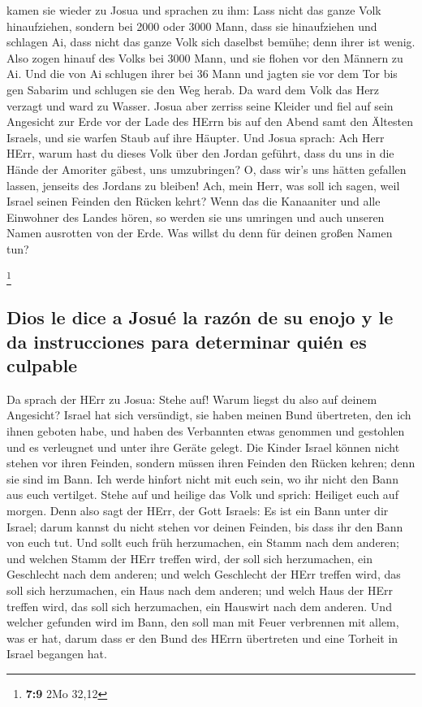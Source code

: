  kamen sie wieder zu Josua und sprachen zu ihm: Lass nicht
das ganze Volk hinaufziehen, sondern bei 2000 oder 3000 Mann, dass sie
hinaufziehen und schlagen Ai, dass nicht das ganze Volk sich daselbst
bemühe; denn ihrer ist wenig.  Also zogen hinauf des Volks
bei 3000 Mann, und sie flohen vor den Männern zu Ai.  Und
die von Ai schlugen ihrer bei 36 Mann und jagten sie vor dem Tor bis gen
Sabarim und schlugen sie den Weg herab. Da ward dem Volk das Herz
verzagt und ward zu Wasser.  Josua aber zerriss seine
Kleider und fiel auf sein Angesicht zur Erde vor der Lade des HErrn bis
auf den Abend samt den Ältesten Israels, und sie warfen Staub auf ihre
Häupter.  Und Josua sprach: Ach Herr HErr, warum hast du
dieses Volk über den Jordan geführt, dass du uns in die Hände der
Amoriter gäbest, uns umzubringen? O, dass wir's uns hätten gefallen
lassen, jenseits des Jordans zu bleiben!  Ach, mein Herr,
was soll ich sagen, weil Israel seinen Feinden den Rücken kehrt?
 Wenn das die Kanaaniter und alle Einwohner des Landes
hören, so werden sie uns umringen und auch unseren Namen ausrotten von
der Erde. Was willst du denn für deinen großen Namen tun?

\footnote{\textbf{7:9} 2Mo 32,12}

\hypertarget{dios-le-dice-a-josuuxe9-la-razuxf3n-de-su-enojo-y-le-da-instrucciones-para-determinar-quiuxe9n-es-culpable}{%
\subsection{Dios le dice a Josué la razón de su enojo y le da
instrucciones para determinar quién es
culpable}\label{dios-le-dice-a-josuuxe9-la-razuxf3n-de-su-enojo-y-le-da-instrucciones-para-determinar-quiuxe9n-es-culpable}}

 Da sprach der HErr zu Josua: Stehe auf! Warum liegst du
also auf deinem Angesicht?  Israel hat sich versündigt,
sie haben meinen Bund übertreten, den ich ihnen geboten habe, und haben
des Verbannten etwas genommen und gestohlen und es verleugnet und unter
ihre Geräte gelegt.  Die Kinder Israel können nicht
stehen vor ihren Feinden, sondern müssen ihren Feinden den Rücken
kehren; denn sie sind im Bann. Ich werde hinfort nicht mit euch sein, wo
ihr nicht den Bann aus euch vertilget.  Stehe auf und
heilige das Volk und sprich: Heiliget euch auf morgen. Denn also sagt
der HErr, der Gott Israels: Es ist ein Bann unter dir Israel; darum
kannst du nicht stehen vor deinen Feinden, bis dass ihr den Bann von
euch tut.  Und sollt euch früh herzumachen, ein Stamm
nach dem anderen; und welchen Stamm der HErr treffen wird, der soll sich
herzumachen, ein Geschlecht nach dem anderen; und welch Geschlecht der
HErr treffen wird, das soll sich herzumachen, ein Haus nach dem anderen;
und welch Haus der HErr treffen wird, das soll sich herzumachen, ein
Hauswirt nach dem anderen.  Und welcher gefunden wird im
Bann, den soll man mit Feuer verbrennen mit allem, was er hat, darum
dass er den Bund des HErrn übertreten und eine Torheit in Israel
begangen hat.

